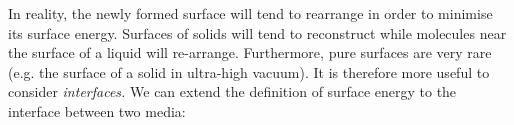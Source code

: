\documentclass[a4paper, 11pt, normalem]{report}
\begin{document}
\begin{figure}[H]
    \centering
\end{figure}
In reality, the newly formed surface will tend to rearrange in order to minimise its surface energy.
Surfaces of solids will tend to reconstruct while molecules near the surface of a liquid will re-arrange.
Furthermore, pure surfaces are very rare (e.g. the surface of a solid in ultra-high vacuum).
It is therefore more useful to consider \textit{interfaces.}
We can extend the definition of surface energy to the interface between two media:
\end{document}
